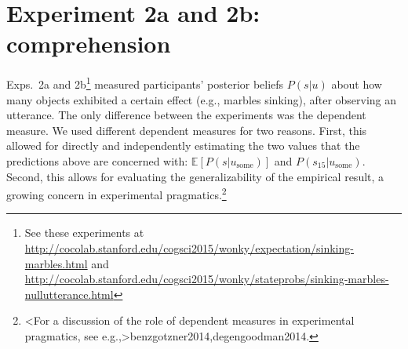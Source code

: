 \documentclass[10pt,letterpaper]{article}
\newcommand{\red}[1]{\textcolor{Red}{#1}}
\begin{document}
%




\section{Experiment 2a and 2b: comprehension}  


Exps.~2a and 2b\footnote{See these experiments at \scriptsize \url{http://cocolab.stanford.edu/cogsci2015/wonky/expectation/sinking-marbles.html} \footnotesize and  \scriptsize \url{http://cocolab.stanford.edu/cogsci2015/wonky/stateprobs/sinking-marbles-nullutterance.html}}  measured participants' posterior beliefs $P(s|u)$ about how many objects exhibited a certain effect (e.g., marbles sinking), after observing an utterance. The only difference between the experiments was the dependent measure. We used different dependent measures for two reasons. First, this allowed for directly and independently estimating the two values that the  predictions above are concerned with: $\mathbb{E}[P(s|u_{\textrm{some}})]$ and $P(s_{15}|u_{\textrm{some}})$. Second, this allows for evaluating the generalizability of the empirical result, a growing concern in experimental pragmatics.\footnote{\citeA<For a discussion of the role of dependent measures in experimental pragmatics, see e.g.,>{benzgotzner2014,degengoodman2014}.}
\end{document}
